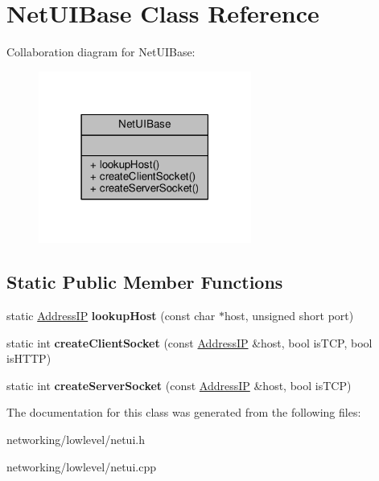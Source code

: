 \hypertarget{classNetUIBase}{}\section{Net\+U\+I\+Base Class Reference}
\label{classNetUIBase}


Collaboration diagram for Net\+U\+I\+Base\+:
\nopagebreak
\begin{figure}[H]
\begin{center}
\leavevmode
\includegraphics[width=198pt]{d2/dc3/classNetUIBase__coll__graph}
\end{center}
\end{figure}
\subsection*{Static Public Member Functions}
\begin{DoxyCompactItemize}
\item 
static \hyperlink{structAddressIP}{Address\+IP} {\bfseries lookup\+Host} (const char $\ast$host, unsigned short port)\hypertarget{classNetUIBase_a83876a314298875cc3c10bc5ecbe5fc5}{}\label{classNetUIBase_a83876a314298875cc3c10bc5ecbe5fc5}

\item 
static int {\bfseries create\+Client\+Socket} (const \hyperlink{structAddressIP}{Address\+IP} \&host, bool is\+T\+CP, bool is\+H\+T\+TP)\hypertarget{classNetUIBase_a0ee5b8eddc195a22a65990cbb1532c4c}{}\label{classNetUIBase_a0ee5b8eddc195a22a65990cbb1532c4c}

\item 
static int {\bfseries create\+Server\+Socket} (const \hyperlink{structAddressIP}{Address\+IP} \&host, bool is\+T\+CP)\hypertarget{classNetUIBase_ab2dd2ee68265bf0b5ce25d2b12127d0f}{}\label{classNetUIBase_ab2dd2ee68265bf0b5ce25d2b12127d0f}

\end{DoxyCompactItemize}


The documentation for this class was generated from the following files\+:\begin{DoxyCompactItemize}
\item 
networking/lowlevel/netui.\+h\item 
networking/lowlevel/netui.\+cpp\end{DoxyCompactItemize}
